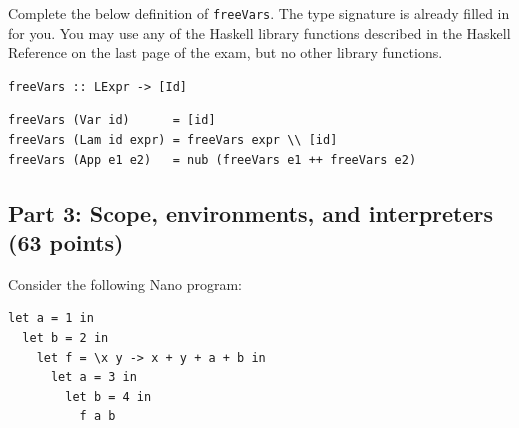 \documentclass[addpoints]{exam}
\begin{document}
\begin{questions}
Complete the below definition of \texttt{freeVars}.  The type signature is already filled in for you.  You may use any of the Haskell library functions described in the Haskell Reference on the last page of the exam, but no other library functions.

\begin{verbatim}
freeVars :: LExpr -> [Id]
\end{verbatim}
\begin{solutionorbox}[\stretch{1}]
\begin{verbatim}
freeVars (Var id)      = [id]
freeVars (Lam id expr) = freeVars expr \\ [id]
freeVars (App e1 e2)   = nub (freeVars e1 ++ freeVars e2)
\end{verbatim}
\end{solutionorbox}

\newpage

\subsection*{\textbf{Part 3: Scope, environments, and interpreters (63 points)}}

\question Consider the following Nano program:
\begin{verbatim}let a = 1 in
  let b = 2 in
    let f = \x y -> x + y + a + b in
      let a = 3 in
        let b = 4 in
          f a b
\end{verbatim}
\end{questions}
\end{document}

